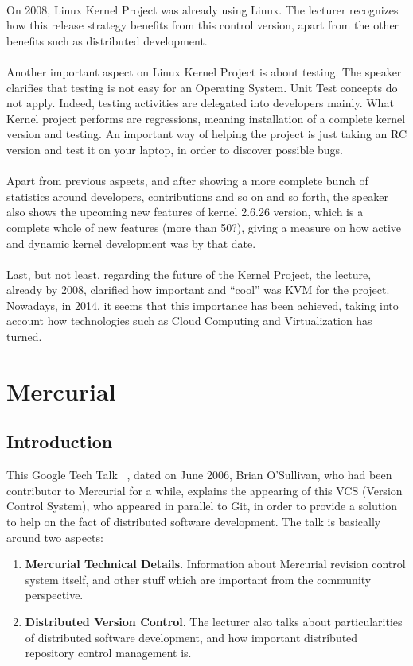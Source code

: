 \documentclass[11pt]{article}
\begin{document}
\\
On 2008, Linux Kernel Project was already using Linux. The lecturer recognizes how this release strategy benefits from this control version, apart from the other benefits such as distributed development.\\
\\
Another important aspect on Linux Kernel Project is about testing. The speaker clarifies that testing is not easy for an Operating System. Unit Test concepts do not apply. Indeed, testing activities are delegated into developers mainly. What Kernel project performs are regressions, meaning installation of a complete kernel version and testing. An important way of helping the project is just taking an RC version and test it on your laptop, in order to discover possible bugs.\\
\\
Apart from previous aspects, and after showing a more complete bunch of statistics around developers, contributions and so on and so forth, the speaker also shows the upcoming new features of kernel 2.6.26 version, which is a complete whole of new features (more than 50?), giving a measure on how active and dynamic kernel development was by that date.\\
\\
Last, but not least, regarding the future of the Kernel Project, the lecture, already by 2008, clarified how important and ``cool'' was KVM for the project. Nowadays, in 2014, it seems that this importance has been achieved, taking into account how technologies such as Cloud Computing and Virtualization has turned.

\pagebreak

\section{Mercurial}
\label{sec:mercurial}
\subsection{Introduction}
This Google Tech Talk ~\cite{TALK05}, dated on June 2006, Brian O'Sullivan, who had been contributor to Mercurial for a while, explains the appearing of this VCS (Version Control System), who appeared in parallel to Git, in order to provide a solution to help on the fact of distributed software development. The talk is basically around two aspects:
\begin{enumerate}
\item{\textbf{Mercurial Technical Details}}. Information about Mercurial revision control system itself, and other stuff which are important from the community perspective.
\item{\textbf{Distributed Version Control}}. The lecturer also talks about particularities of distributed software development, and how important distributed repository control management is.
\end{enumerate}
\end{document}
